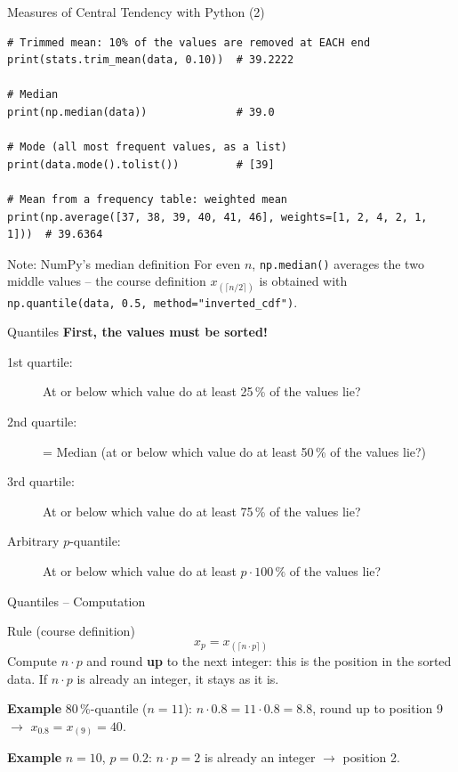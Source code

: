 \documentclass[aspectratio=169,11pt]{beamer}
\begin{document}
\begin{frame}[fragile]{Measures of Central Tendency with Python (2)}
  \lstset{aboveskip=2pt,belowskip=2pt}
\begin{lstlisting}
# Trimmed mean: 10% of the values are removed at EACH end
print(stats.trim_mean(data, 0.10))  # 39.2222

# Median
print(np.median(data))              # 39.0

# Mode (all most frequent values, as a list)
print(data.mode().tolist())         # [39]

# Mean from a frequency table: weighted mean
print(np.average([37, 38, 39, 40, 41, 46], weights=[1, 2, 4, 2, 1, 1]))  # 39.6364
\end{lstlisting}
\begin{alertblock}{Note: NumPy's median definition}
  For even $n$, \texttt{np.median()} averages the two middle values -- the
  course definition $x_{(\lceil n/2 \rceil)}$ is obtained with
  \texttt{np.quantile(data, 0.5, method="inverted\_cdf")}.
\end{alertblock}
\end{frame}

\begin{frame}{Quantiles}
  \textbf{First, the values must be sorted!}

  \begin{description}
    \item[1st quartile:] At or below which value do at least 25\,\% of the values lie?
    \item[2nd quartile:] = Median (at or below which value do at least 50\,\% of the values lie?)
    \item[3rd quartile:] At or below which value do at least 75\,\% of the values lie?
    \item[Arbitrary $p$-quantile:] At or below which value do at least $p \cdot 100\,\%$ of the values lie?
  \end{description}
\end{frame}

\begin{frame}{Quantiles -- Computation}
  \begin{block}{Rule (course definition)}
    \[ x_p = x_{(\lceil n \cdot p \rceil)} \]
    Compute $n \cdot p$ and round \textbf{up} to the next integer: this is the position in the
    sorted data. If $n \cdot p$ is already an integer, it stays as it is.
  \end{block}

  \vspace{0.4cm}
  \textbf{Example} 80\,\%-quantile ($n = 11$): $n \cdot 0.8 = 11 \cdot 0.8 = 8.8$, round up to
  position 9 $\to$ $x_{0.8} = x_{(9)} = 40$.

  \vspace{0.2cm}
  \textbf{Example} $n = 10$, $p = 0.2$: $n \cdot p = 2$ is already an integer $\to$ position 2.
\end{frame}
\end{document}
